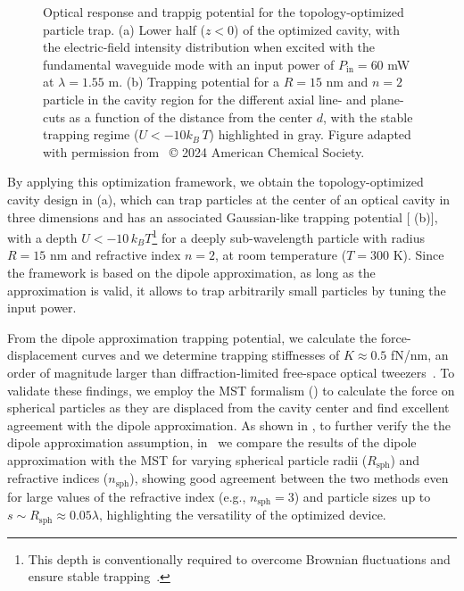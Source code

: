 \begin{figure}[tb]
    \centering
    \caption{Optical response and trappig potential for the topology-optimized particle trap. (a) Lower half ($z<0$) of the optimized cavity, with the electric-field intensity
    distribution when excited with the fundamental waveguide mode with an input power of $P_\text{in}=60$ mW at $\lambda=1.55$ \textmu m. (b) Trapping potential for a $R=15$ nm and $n=2$ particle in the cavity region for the different axial line- and plane-cuts as a function
    of the distance from the center $d$, with the stable trapping regime ($U<-10 k_B\, T$) highlighted in gray. Figure adapted with permission from~\cite{ownpub1} © 2024 American Chemical Society.}
    \label{fig:MST_dipole}
\end{figure}

By applying this optimization framework, we obtain the topology-optimized cavity design in  (a), which can trap particles at the center of an optical
cavity in three dimensions and has an associated Gaussian-like trapping potential [ (b)], with a depth  $U<-10\, k_B T$\footnote{This depth is conventionally required to overcome Brownian fluctuations and ensure stable trapping~\cite{novotny}.} for a deeply sub-wavelength particle with radius $R=15$ nm and refractive index $n=2$, at room temperature ($T=300$ K).
Since the framework is based on the dipole approximation,
as long as the approximation is valid, it allows to trap arbitrarily small particles by tuning the input power.

From the dipole approximation trapping potential, we calculate the force-displacement curves and we determine trapping stiffnesses
of $K \approx 0.5$ fN/nm, an order of magnitude larger than diffraction-limited free-space optical tweezers~\cite{ownpub1}. To validate these findings,
we employ the MST formalism () to calculate the force on spherical particles as they are displaced from the cavity center and find excellent
agreement with the dipole approximation. As shown in , to further verify the the dipole approximation assumption, in~\cite{ownpub3} we compare the results of the dipole approximation with the MST
for varying spherical particle radii ($R_\text{sph}$) and refractive indices ($n_\text{sph}$), showing good agreement between the two methods
even for large values of the refractive index (e.g., $n_\text{sph}=3$) and particle sizes up to $s \sim R_\text{sph}\approx 0.05 \lambda$, highlighting the versatility of the optimized device.

